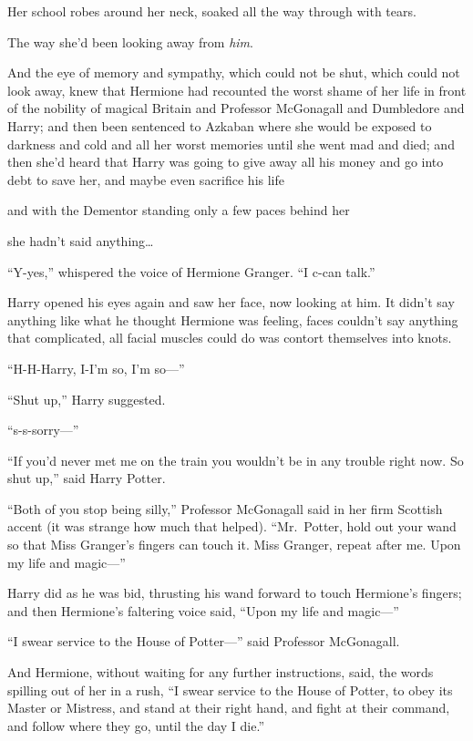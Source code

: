 Her school robes around her neck, soaked all the way through with tears.

The way she'd been looking away from \emph{him}.

And the eye of memory and sympathy, which could not be shut, which could
not look away, knew that Hermione had recounted the worst shame of her
life in front of the nobility of magical Britain and Professor
McGonagall and Dumbledore and Harry; and then been sentenced to Azkaban
where she would be exposed to darkness and cold and all her worst
memories until she went mad and died; and then she'd heard that Harry
was going to give away all his money and go into debt to save her, and
maybe even sacrifice his life

and with the Dementor standing only a few paces behind her

she hadn't said anything\ldots{}

``Y-yes,'' whispered the voice of Hermione Granger. ``I c-can talk.''

Harry opened his eyes again and saw her face, now looking at him. It
didn't say anything like what he thought Hermione was feeling, faces
couldn't say anything that complicated, all facial muscles could do was
contort themselves into knots.

``H-H-Harry, I-I'm so, I'm so---''

``Shut up,'' Harry suggested.

``s-s-sorry---''

``If you'd never met me on the train you wouldn't be in any trouble
right now. So shut up,'' said Harry Potter.

``Both of you stop being silly,'' Professor McGonagall said in her firm
Scottish accent (it was strange how much that helped). ``Mr.~Potter,
hold out your wand so that Miss Granger's fingers can touch it. Miss
Granger, repeat after me. Upon my life and magic---''

Harry did as he was bid, thrusting his wand forward to touch Hermione's
fingers; and then Hermione's faltering voice said, ``Upon my life and
magic---''

``I swear service to the House of Potter---'' said Professor McGonagall.

And Hermione, without waiting for any further instructions, said, the
words spilling out of her in a rush, ``I swear service to the House of
Potter, to obey its Master or Mistress, and stand at their right hand,
and fight at their command, and follow where they go, until the day I
die.''


